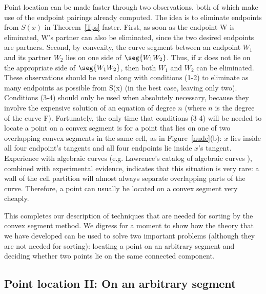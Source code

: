 Point location can be made faster through two observations, 
both of which make use of the endpoint pairings already computed.
The idea is to eliminate endpoints from $S(x)$ in Theorem~\ref{Tps} faster.
First, as soon as the endpoint W is eliminated, W's partner can also be 
eliminated, since the two desired endpoints are partners.
Second, by convexity, the curve segment between an endpoint $W_{1}$ and its
partner $W_{2}$ lies on one side of $\seg{W_{1}W_{2}}$.
Thus, if $x$ does not lie on the appropriate side of $\seg{W_{1}W_{2}}$, then 
both $W_{1}$ and $W_{2}$ can be eliminated.
These observations should be used along with conditions (1-2)
to eliminate as many endpoints as possible from S(x) (in the best case, leaving 
only two). 
Conditions (3-4) should only be used when absolutely necessary, because they 
involve the expensive solution of an equation of degree $n$ 
(where $n$ is the degree of the curve F).
Fortunately, the only time that conditions (3-4) will be needed to locate a point on a 
convex segment is for a point that lies on one of two overlapping convex segments
\label{page-overlap}
in the same cell, as in Figure~\ref{nude}(b): $x$ lies inside all four endpoint's tangents
and all four endpoints lie inside $x$'s tangent.
Experience with algebraic curves (e.g. Lawrence's catalog of algebraic curves \cite{law}),
combined with experimental evidence, indicates that this situation is very rare:
a wall of the cell partition will almost always separate overlapping parts of the curve.
Therefore, a point can usually be located on a convex segment very cheaply.

This completes our description of techniques that are needed for sorting by 
the convex segment method.
We digress for a moment to show how the theory that we have developed can be used
to solve two important problems (although they are not needed for sorting):
locating a point on an arbitrary segment and deciding whether two points lie on the
same connected component.

\subsection{Point location II: On an arbitrary segment}


